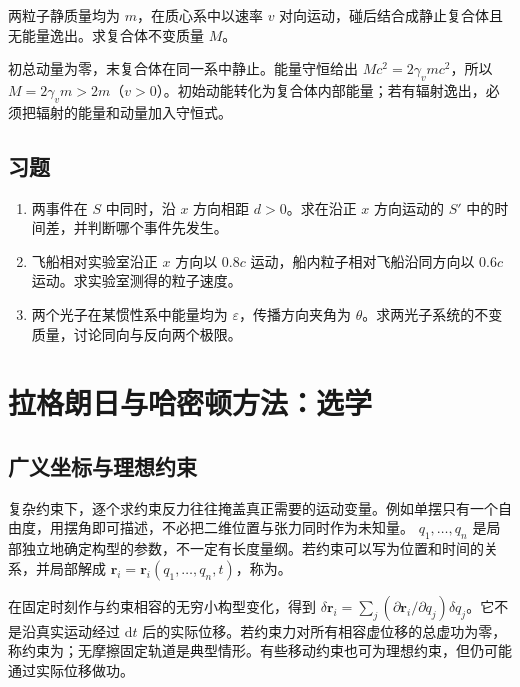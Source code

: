 \documentclass[UTF8,12pt,a4paper,fontset=fandol]{ctexbook}
\begin{document}
\begin{example}[对向粒子的完全非弹性碰撞]
两粒子静质量均为 $m$，在质心系中以速率 $v$ 对向运动，碰后结合成静止复合体且无能量逸出。求复合体不变质量 $M$。
\end{example}
\begin{solve}
初总动量为零，末复合体在同一系中静止。能量守恒给出 $Mc^2=2\gamma_vmc^2$，所以 $M=2\gamma_vm>2m$（$v>0$）。初始动能转化为复合体内部能量；若有辐射逸出，必须把辐射的能量和动量加入守恒式。
\end{solve}

\section{习题}
\begin{enumerate}[label=\thechapter.\arabic*,ref=\thechapter.\arabic*]
\item\label{exr:mech-simultaneity} 两事件在 $S$ 中同时，沿 $x$ 方向相距 $d>0$。求在沿正 $x$ 方向运动的 $S'$ 中的时间差，并判断哪个事件先发生。
\item\label{exr:mech-velocity-add} 飞船相对实验室沿正 $x$ 方向以 $0.8c$ 运动，船内粒子相对飞船沿同方向以 $0.6c$ 运动。求实验室测得的粒子速度。
\item\label{exr:mech-photons} 两个光子在某惯性系中能量均为 $\varepsilon$，传播方向夹角为 $\theta$。求两光子系统的不变质量，讨论同向与反向两个极限。
\end{enumerate}

\chapter{拉格朗日与哈密顿方法：选学}
\label{chap:mech-lagrange}

\section{广义坐标与理想约束}
复杂约束下，逐个求约束反力往往掩盖真正需要的运动变量。例如单摆只有一个自由度，用摆角即可描述，不必把二维位置与张力同时作为未知量。 $q_1,\ldots,q_n$ 是局部独立地确定构型的参数，不一定有长度量纲。若约束可以写为位置和时间的关系，并局部解成 $\mathbf r_i=\mathbf r_i(q_1,\ldots,q_n,t)$，称为。

在固定时刻作与约束相容的无穷小构型变化，得到 $\delta\mathbf r_i=\sum_j(\partial\mathbf r_i/\partial q_j)\delta q_j$。它不是沿真实运动经过 $\mathrm dt$ 后的实际位移。若约束力对所有相容虚位移的总虚功为零，称约束为；无摩擦固定轨道是典型情形。有些移动约束也可为理想约束，但仍可能通过实际位移做功。
\end{document}
